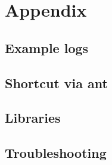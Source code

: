 \documentclass[a4paper, oneside, 11pt]{scrartcl}
\begin{document}
\section{Appendix}
\subsection{Example logs}
\subsection{Shortcut via ant}
\subsection{Libraries}

\subsection{Troubleshooting}
\end{document}
